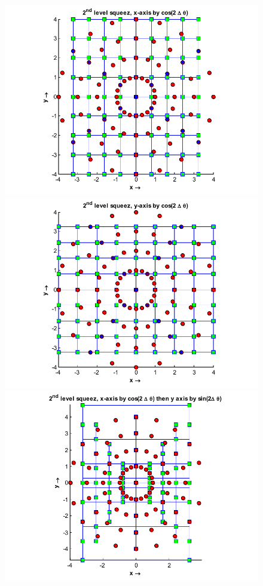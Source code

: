 \documentclass{UCF_ETD}
\begin{document}
 \begin{figure}[H]
 \begin{center}
 \includegraphics[scale=0.7]{PolarSphericalDFT/SecondLevelXGrid}
 \includegraphics[scale=0.7]{PolarSphericalDFT/SecondLevelYGrid}
 \includegraphics[scale=0.7]{PolarSphericalDFT/SecondLevelXYGrid}

\end{center}
\end{figure}
\end{document}
